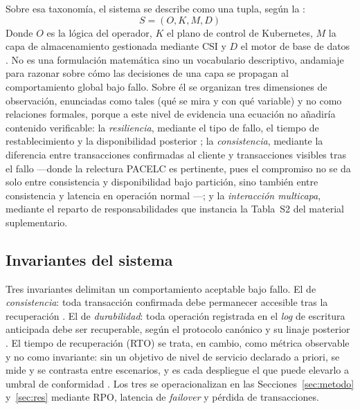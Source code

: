 Sobre esa taxonomía, el sistema se describe como una tupla, según la :
\begin{equation}\label{eq:modelo}
S = (O, K, M, D)
\end{equation}
Donde $O$ es la lógica del operador, $K$ el plano de control de Kubernetes, $M$ la capa de almacenamiento gestionada mediante CSI y $D$ el motor de base de datos \citep{schwarzkopf2013,burns2016,k8s2024csi}. No es una formulación matemática sino un vocabulario descriptivo, andamiaje para razonar sobre cómo las decisiones de una capa se propagan al comportamiento global bajo fallo. Sobre él se organizan tres dimensiones de observación, enunciadas como tales  (qué se mira y con qué variable) y no como relaciones formales, porque a este nivel de evidencia una ecuación no añadiría contenido verificable: la \textit{resiliencia}, mediante el tipo de fallo, el tiempo de restablecimiento y la disponibilidad posterior \citep{avizienis2004}; la \textit{consistencia}, mediante la diferencia entre transacciones confirmadas al cliente y transacciones visibles tras el fallo —donde la relectura PACELC es pertinente, pues el compromiso no se da solo entre consistencia y disponibilidad bajo partición, sino también entre consistencia y latencia en operación normal \citep{gilbert2002,abadi2012,bailis2013}—; y la \textit{interacción multicapa}, mediante el reparto de responsabilidades que instancia la Tabla~S2 del material suplementario.

\subsection{Invariantes del sistema}\label{sec:inv}
Tres invariantes delimitan un comportamiento aceptable bajo fallo. El de \textit{consistencia}: toda transacción confirmada debe permanecer accesible tras la recuperación \citep{bailis2013}. El de \textit{durabilidad}: toda operación registrada en el \textit{log} de escritura anticipada debe ser recuperable, según el protocolo canónico y su linaje posterior \citep{mohan1992,han2024}. El tiempo de recuperación (RTO) se trata, en cambio, como métrica observable y no como invariante: sin un objetivo de nivel de servicio declarado a priori, se mide y se contrasta entre escenarios, y es cada despliegue el que puede elevarlo a umbral de conformidad \citep{avizienis2004}. Los tres se operacionalizan en las Secciones~\ref{sec:metodo} y~\ref{sec:res} mediante RPO, latencia de \textit{failover} y pérdida de transacciones.

